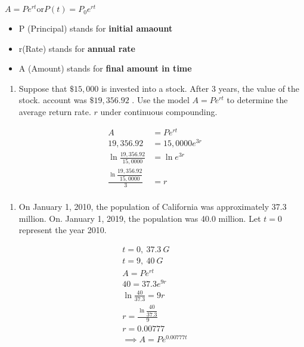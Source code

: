 \documentclass{book}
\begin{document}
\(A=Pe^{rt}\text{or}P(t)=P_0e^{rt}\)

\begin{itemize}
	\tightlist
	\item
	      P (Principal) stands for \textbf{initial amaount}
	\item
	      r(Rate) stands for \textbf{annual rate}
	\item
	      A (Amount) stands for \textbf{final amount in time}
\end{itemize}

\begin{enumerate}
	\def\labelenumi{\arabic{enumi}.}
	\setcounter{enumi}{42}
	\tightlist
	\item
	      Suppose that \(\$15,000\) is invested into a stock. After 3 years, the
	      value of the stock. account was \(\$19,356.92\) . Use the model
	      \(A=Pe^{rt}\) to determine the average return rate. \(r\) under
	      continuous compounding.
\end{enumerate}


	\begin{align}
		A & = Pe^{rt} \\ 19,356.92 &= 15,0000 e^{3r} \\ \ln \frac{19,356.92}{15,0000} &= \ln e^{3r} \\ \frac{\ln \dfrac{19,356.92}{15,0000}}{3} &= r \\
	\end{align}


\begin{enumerate}
	\def\labelenumi{\arabic{enumi}.}
	\setcounter{enumi}{43}
	\tightlist
	\item
	      On January 1, 2010, the population of California was approximately
	      37.3 million. On. January 1, 2019, the population was 40.0 million.
	      Let \(t=0\) represent the year 2010.
\end{enumerate}


	\begin{align}
		t = 0,\ 37.3\ G \\ t = 9,\ 40\ G \\ A=Pe^{rt} \\ 40 = 37.3 e^{9r} \\ \ln \frac{40}{37.3} = 9r \\ r = \frac{\ln \dfrac{40}{37.3}}{9} \\ r = 0.00777 \\ \implies A=Pe^{0.00777t} \\
	\end{align}
\end{document}
